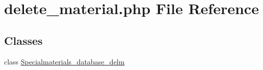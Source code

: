\hypertarget{delete__material_8php}{\section{delete\+\_\+material.\+php File Reference}
\label{delete__material_8php}
}
\subsection*{Classes}
\begin{DoxyCompactItemize}
\item 
class \hyperlink{classSpecialmaterials__database__delm}{Specialmaterials\+\_\+database\+\_\+delm}
\end{DoxyCompactItemize}
